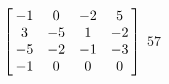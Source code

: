 {$\left[\hskip -3pt \begin{array}{cccc} -1&0&-2&5\\  3&-5&1&-2
\\  -5&-2&-1&-3\\  -1&0&0&0\end{array}\hskip -3pt \right]$} 
{$57$}



  

